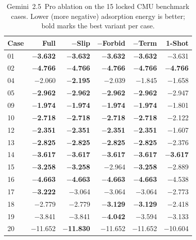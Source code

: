 
\begin{table}[h]
\centering
\small
\caption{Gemini~2.5~Pro ablation on the 15 locked CMU benchmark cases. Lower (more negative) adsorption energy is better; bold marks the best variant per case.}
\label{tab:si-ablation-gemini}
\begin{tabular}{lrrrrr}
\toprule
Case & Full & $-$Slip & $-$Forbid & $-$Term & 1-Shot \\
\midrule
01 & \textbf{$-$3.632} & \textbf{$-$3.632} & \textbf{$-$3.632} & \textbf{$-$3.632} & $-$3.631 \\
02 & \textbf{$-$4.766} & \textbf{$-$4.766} & \textbf{$-$4.766} & \textbf{$-$4.766} & \textbf{$-$4.766} \\
04 & $-$2.060 & \textbf{$-$2.195} & $-$2.039 & $-$1.845 & $-$1.658 \\
05 & \textbf{$-$2.962} & \textbf{$-$2.962} & \textbf{$-$2.962} & \textbf{$-$2.962} & $-$2.947 \\
09 & \textbf{$-$1.974} & \textbf{$-$1.974} & \textbf{$-$1.974} & \textbf{$-$1.974} & $-$1.801 \\
10 & \textbf{$-$2.718} & \textbf{$-$2.718} & \textbf{$-$2.718} & \textbf{$-$2.718} & $-$2.122 \\
12 & \textbf{$-$2.351} & \textbf{$-$2.351} & \textbf{$-$2.351} & \textbf{$-$2.351} & $-$1.607 \\
13 & \textbf{$-$2.825} & \textbf{$-$2.825} & \textbf{$-$2.825} & \textbf{$-$2.825} & $-$2.376 \\
14 & \textbf{$-$3.617} & \textbf{$-$3.617} & \textbf{$-$3.617} & \textbf{$-$3.617} & \textbf{$-$3.617} \\
15 & \textbf{$-$3.258} & \textbf{$-$3.258} & $-$2.964 & \textbf{$-$3.258} & $-$2.889 \\
16 & \textbf{$-$4.663} & \textbf{$-$4.663} & \textbf{$-$4.663} & \textbf{$-$4.663} & $-$4.538 \\
17 & \textbf{$-$3.222} & $-$3.064 & $-$3.064 & $-$3.064 & $-$2.773 \\
18 & $-$2.779 & $-$2.779 & \textbf{$-$3.129} & \textbf{$-$3.129} & $-$2.418 \\
19 & $-$3.841 & $-$3.841 & \textbf{$-$4.042} & $-$3.594 & $-$3.133 \\
20 & $-$11.652 & \textbf{$-$11.830} & $-$11.652 & $-$11.652 & $-$10.604 \\
\bottomrule
\end{tabular}
\end{table}

